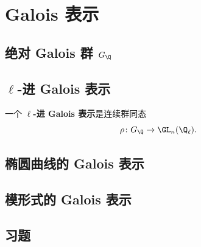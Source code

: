 \chapter{Galois 表示}
\label{ch:galois-representations}

\section{绝对 Galois 群 $G_\Q$}


\section{$\ell$-进 Galois 表示}

\begin{definition}
一个 \textbf{$\ell$-进 Galois 表示}是连续群同态
\[
  \rho\colon G_\Q \to \GL_n(\Q_\ell).
\]
\end{definition}


\section{椭圆曲线的 Galois 表示}



\section{模形式的 Galois 表示}


\section{习题}

